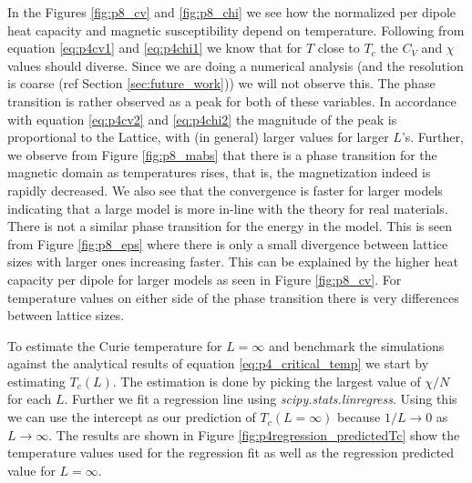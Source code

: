 \documentclass[../main_proj4_correct_template.tex]{subfiles}
\begin{document}
In the Figures \ref{fig:p8_cv} and \ref{fig:p8_chi} we see how the normalized per dipole heat capacity and magnetic susceptibility depend on temperature. Following from equation \eqref{eq:p4cv1} and \eqref{eq:p4chi1} we know that for $T$ close to $T_c$ the $C_V$ and $\chi$ values should diverse. Since we are doing a numerical analysis (and the resolution is coarse (ref Section \ref{sec:future_work})) we will not observe this. The phase transition is rather observed as a peak for both of these variables. In accordance with equation \eqref{eq:p4cv2} and \eqref{eq:p4chi2} the magnitude of the peak is proportional to the Lattice, with (in general) larger values for larger $L$'s. Further, we observe from Figure \ref{fig:p8_mabs} that there is a  phase transition for the magnetic domain as temperatures rises, that is, the magnetization indeed is rapidly decreased. We also see that the convergence is faster for larger models indicating that a large model is more in-line with the theory for real materials. There is not a similar phase transition for the energy in the model. This is seen from Figure \ref{fig:p8_eps} where there is only a small divergence between lattice sizes with larger ones increasing faster. This can be explained by the higher heat capacity per dipole for larger models as seen in Figure \ref{fig:p8_cv}. For temperature values on either side of the phase transition there is very differences between lattice sizes. 

To estimate the Curie temperature for $L=\infty$ and benchmark the simulations against the analytical results of equation \eqref{eq:p4_critical_temp} we start by estimating $T_c(L)$. The estimation is done by picking the largest value of $\chi/N$ for each $L$. Further we fit a regression line using \textit{scipy.stats.linregress}. Using this we can use the intercept as our prediction of $T_c(L=\infty)$ because $1/L \to 0$ as $L\to \infty$. The results are shown in Figure \ref{fig:p4regression_predictedTc} show the temperature values used for the regression fit as well as the regression predicted value for $L=\infty$.
\end{document}
